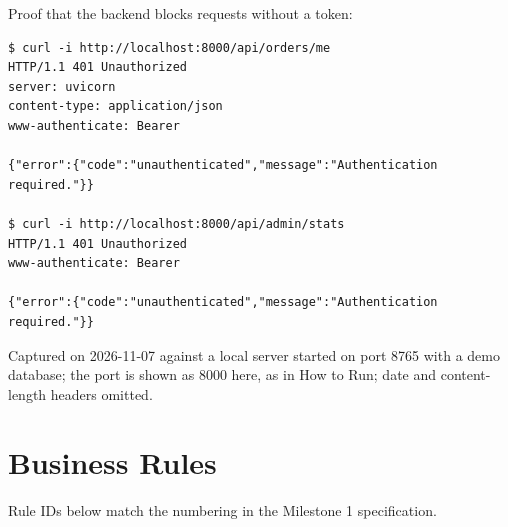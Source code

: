 \documentclass[11pt,a4paper]{article}
\begin{document}
\medskip
Proof that the backend blocks requests without a token:
\begin{lstlisting}
$ curl -i http://localhost:8000/api/orders/me
HTTP/1.1 401 Unauthorized
server: uvicorn
content-type: application/json
www-authenticate: Bearer

{"error":{"code":"unauthenticated","message":"Authentication required."}}

$ curl -i http://localhost:8000/api/admin/stats
HTTP/1.1 401 Unauthorized
www-authenticate: Bearer

{"error":{"code":"unauthenticated","message":"Authentication required."}}
\end{lstlisting}
{\small\color{ink2}Captured on 2026-11-07 against a local server started on port 8765 with a demo
database; the port is shown as 8000 here, as in How to Run; date and content-length headers omitted.}


\section{Business Rules}

Rule IDs below match the numbering in the Milestone 1 specification.
\end{document}
